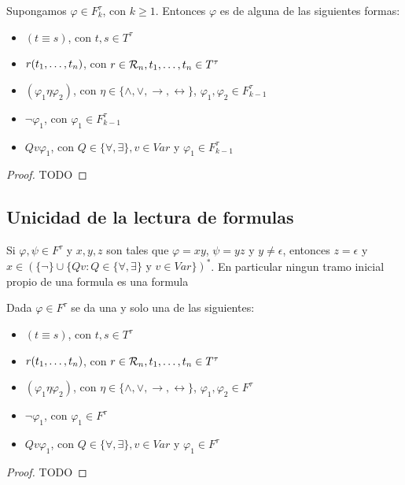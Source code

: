\begin{lemma}
  Supongamos $\varphi \in F_k^\tau$, con $k \geq 1$. Entonces $\varphi$ es de alguna de las siguientes formas:
  \begin{itemize}
    \item $(t\equiv s)$, con $t, s \in T^\tau$
    \item $r(t_{1}, \dots, t_{n})$, con $r \in \mathcal{R}_n, t_{1}, \dots, t_{n} \in T^\tau$
    \item $(\varphi_1 \eta \varphi_2)$, con $\eta \in \{\land, \lor, \rightarrow, \leftrightarrow\}$, $\varphi_1, \varphi_2 \in F_{k-1}^\tau$
    \item $\neg\varphi_1$, con $\varphi_1 \in F_{k-1}^\tau$
    \item $Qv\varphi_1$, con $Q \in \{\forall, \exists\}, v \in Var$ y $\varphi_1 \in F_{k-1}^\tau$
  \end{itemize}
\end{lemma}
\begin{proof}
  TODO
\end{proof}

\subsection{Unicidad de la lectura de formulas}
\begin{proposition}
  Si $\varphi, \psi \in F^\tau$ y $x, y, z$ son tales que $\varphi = xy$, $\psi = yz$ y $y \neq \epsilon$, entonces
  $z = \epsilon$ y $x \in (\{\neg\} \cup \{Qv : Q \in \{\forall, \exists\} \text{ y } v \in Var\})^*$. En particular ningun tramo inicial
  propio de una formula es una formula
\end{proposition}
\noproof
\begin{theorem}
  Dada $\varphi \in F^\tau$ se da una y solo una de las siguientes:
  \begin{itemize}
    \item $(t\equiv s)$, con $t, s \in T^\tau$
    \item $r(t_{1}, \dots, t_{n})$, con $r \in \mathcal{R}_n, t_{1}, \dots, t_{n} \in T^\tau$
    \item $(\varphi_1 \eta \varphi_2)$, con $\eta \in \{\land, \lor, \rightarrow, \leftrightarrow\}$, $\varphi_1, \varphi_2 \in F^\tau$
    \item $\neg\varphi_1$, con $\varphi_1 \in F^\tau$
    \item $Qv\varphi_1$, con $Q \in \{\forall, \exists\}, v \in Var$ y $\varphi_1 \in F^\tau$
  \end{itemize}
\end{theorem}
\begin{proof}
  TODO
\end{proof}
